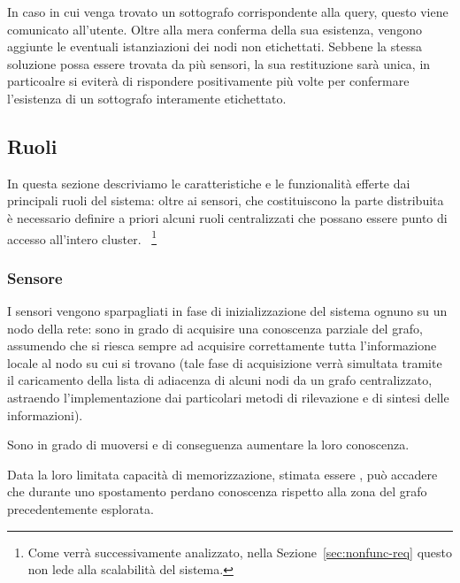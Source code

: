 \documentclass{llncs}
\begin{document}
In caso in cui venga trovato un sottografo corrispondente alla query,
questo viene comunicato all'utente.
Oltre alla mera conferma della sua esistenza, vengono aggiunte
le eventuali istanziazioni dei nodi non etichettati.
Sebbene la stessa soluzione possa essere trovata da più sensori,
la sua restituzione sarà unica, in particoalre si eviterà di rispondere
positivamente più volte per confermare l'esistenza di un sottografo
interamente etichettato.\\


\subsection{Ruoli}
In questa sezione descriviamo le caratteristiche e le funzionalità
efferte dai principali ruoli del sistema:
oltre ai sensori, che costituiscono la parte distribuita
è necessario definire a priori alcuni ruoli centralizzati
che possano essere punto di accesso all'intero cluster.%
~\footnote{Come verrà successivamente analizzato,
  nella Sezione~\ref{sec:nonfunc-req} questo non lede alla
  scalabilità del sistema.}

\subsubsection*{Sensore}
I sensori vengono sparpagliati in fase di inizializzazione del
sistema ognuno su un nodo della rete: sono in grado di
acquisire una conoscenza parziale del grafo, assumendo che si
riesca sempre ad acquisire correttamente tutta l'informazione
locale al nodo su cui si trovano
(tale fase di acquisizione verrà simultata tramite il caricamento
della lista di adiacenza di alcuni nodi da un grafo centralizzato,
astraendo l'implementazione dai particolari metodi di
rilevazione e di sintesi delle informazioni).

Sono in grado di muoversi e di conseguenza aumentare la loro
conoscenza.

Data la loro limitata capacità di memorizzazione,
stimata essere ,
può accadere che
durante uno spostamento perdano conoscenza rispetto alla zona del
grafo precedentemente esplorata.
\end{document}
